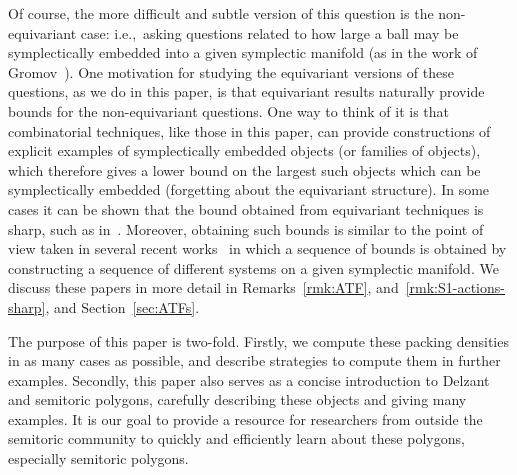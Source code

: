 \documentclass[10pt,a4paper]{amsart}
\numberwithin{equation}{section}
\theoremstyle{definition}
\theoremstyle{plain}
\theoremstyle{plain}
\begin{document}
Of course, the more difficult and subtle version of this question is the non-equivariant case: i.e.,~asking questions related to how large a ball may be symplectically embedded into a given symplectic manifold (as in the work of Gromov~\cite{Gromov1985}). One motivation for studying the equivariant versions of these questions, as we do in this paper, is that equivariant results naturally provide bounds for the non-equivariant questions. One way to think of it is that combinatorial techniques, like those in this paper, can provide constructions of explicit examples of symplectically embedded objects (or families of objects), which therefore gives a lower bound on the largest such objects which can be symplectically embedded (forgetting about the equivariant structure).
In some cases it can be shown that the bound obtained from equivariant techniques is sharp, such as in~\cite{HS17}.
Moreover, obtaining such bounds is similar to the point of view taken in several recent works~\cite{CGHMP,CV,four-periodic,macgill,MMW-staircasepatterns} in which a sequence of bounds is obtained by constructing a sequence of different systems on a given symplectic manifold. We discuss these papers in more detail in Remarks~\ref{rmk:ATF}, and~\ref{rmk:S1-actions-sharp}, and Section~\ref{sec:ATFs}.

The purpose of this paper is two-fold. Firstly, we compute these packing densities in as many cases as possible, and describe strategies to compute them in further examples.
Secondly, this paper also serves as a concise introduction to Delzant and semitoric polygons, carefully describing these objects and giving many examples. It is our goal to provide a resource for researchers from outside the semitoric community to quickly and efficiently learn about these polygons, especially semitoric polygons.
\end{document}

